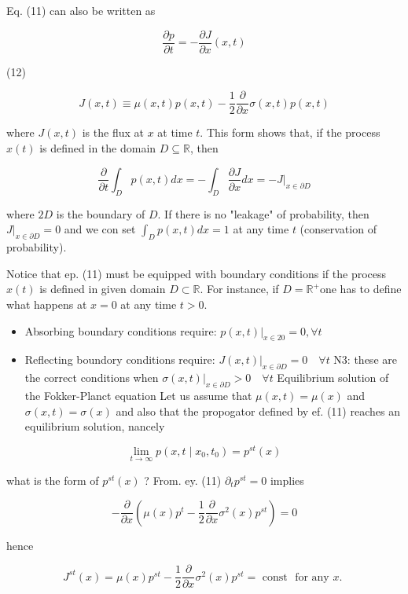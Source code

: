 Eq. (11) can also be written as

$$ \frac{\partial p}{\partial t}=-\frac{\partial J}{\partial x}(x, t) $$

(12)

$$ J(x, t) \equiv \mu(x, t) p(x, t)-\frac{1}{2} \frac{\partial}{\partial x} \sigma(x, t) p(x, t) $$

where $J(x, t)$ is the flux at $x$ at time $t$. This form shows that, if the process $x(t)$ is defined in the domain $D \subseteq \mathbb{R}$, then

$$ \frac{\partial}{\partial t} \int_{D} p(x, t) d x=-\int_{D} \frac{\partial J}{\partial x} d x=-\left.J\right|_{x \in \partial D} $$

where $2 D$ is the boundary of $D$. If there is no "leakage" of probability, then $\left.J\right|_{x \in \partial D}=0$ and we con set $\int_{D} p(x, t) d x=1$ at any time $t$ (conservation of probability).

Notice that ep. (11) must be equipped with boundary conditions if the process $x(t)$ is defined in given domain $D \subset \mathbb{R}$. For instance, if $D=\mathbb{R}^{+}$one has to define what happens at $x=0$ at any time $t>0$.

\begin{itemize}
  \item Absorbing boundary conditions require: $\left.p(x, t)\right|_{x \in 20}=0, \forall t$
  \item Reflecting boundory conditions require: $\left.J(x, t)\right|_{x \in \partial D}=0 \quad \forall t$ N3: these are the correct conditions when $\left.\sigma(x, t)\right|_{x \in \partial D}>0 \quad \forall t$ Equilibrium solution of the Fokker-Planct equation Let us assume that $\mu(x, t)=\mu(x)$ and $\sigma(x, t)=\sigma(x)$ and also that the propogator defined by ef. (11) reaches an equilibrium solution, nancely
\end{itemize}

$$ \lim _{t \rightarrow \infty} p\left(x, t \mid x_{0}, t_{0}\right)=p^{s t}(x) $$

what is the form of $p^{s t}(x)$ ? From. ey. (11) $\partial_{t} p^{s t}=0$ implies

$$ -\frac{\partial}{\partial x}\left(\mu(x) p^{t}-\frac{1}{2} \frac{\partial}{\partial x} \sigma^{2}(x) p^{s t}\right)=0 $$

hence

$$ J^{s t}(x)=\mu(x) p^{s t}-\frac{1}{2} \frac{\partial}{\partial x} \sigma^{2}(x) p^{s t}=\text { const } \text { for any } x \text {. } $$

